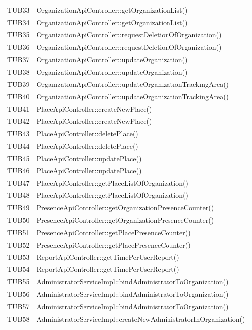 {\begin{longtable}{C{2cm} C{12cm}}
		TUB33 & OrganizationApiController::getOrganizationList()\\
		TUB34 & OrganizationApiController::getOrganizationList()\\
		TUB35 & OrganizationApiController::requestDeletionOfOrganization()\\
		TUB36 & OrganizationApiController::requestDeletionOfOrganization()\\
		TUB37 & OrganizationApiController::updateOrganization()\\
		TUB38 & OrganizationApiController::updateOrganization()\\
		TUB39 & OrganizationApiController::updateOrganizationTrackingArea()\\
		TUB40 & OrganizationApiController::updateOrganizationTrackingArea()\\
		TUB41 & PlaceApiController::createNewPlace()\\
		TUB42 & PlaceApiController::createNewPlace()\\
		TUB43 & PlaceApiController::deletePlace()\\
		TUB44 & PlaceApiController::deletePlace()\\
		TUB45 & PlaceApiController::updatePlace()\\
		TUB46 & PlaceApiController::updatePlace()\\
		TUB47 & PlaceApiController::getPlaceListOfOrganization()\\
		TUB48 & PlaceApiController::getPlaceListOfOrganization()\\
		TUB49 & PresenceApiController::getOrganizationPresenceCounter()\\
		TUB50 & PresenceApiController::getOrganizationPresenceCounter()\\
		TUB51 & PresenceApiController::getPlacePresenceCounter()\\
		TUB52 & PresenceApiController::getPlacePresenceCounter()\\
		TUB53 & ReportApiController::getTimePerUserReport()\\
		TUB54 & ReportApiController::getTimePerUserReport()\\
		TUB55 & AdministratorServiceImpl::bindAdministratorToOrganization()\\
		TUB56 & AdministratorServiceImpl::bindAdministratorToOrganization()\\
		TUB57 & AdministratorServiceImpl::bindAdministratorToOrganization()\\
		TUB58 & AdministratorServiceImpl::createNewAdministratorInOrganization()\\

\end{longtable}}
